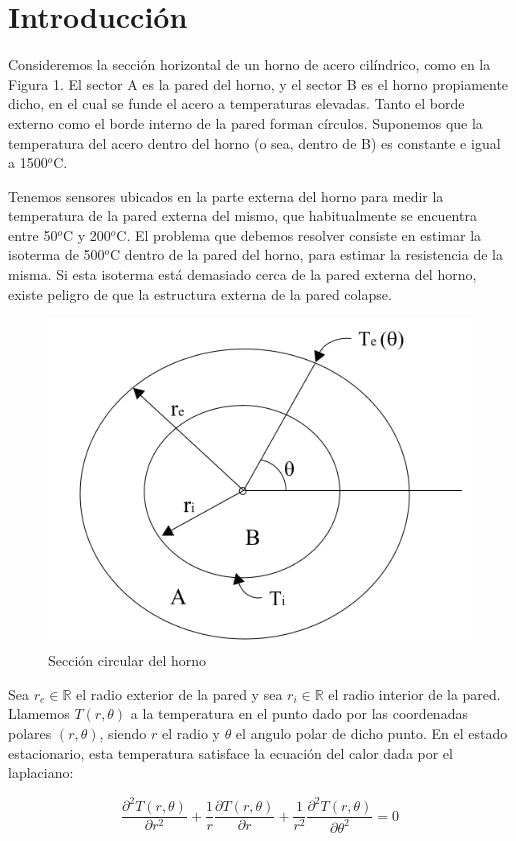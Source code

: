 \section{Introducción}

Consideremos la secci\'on horizontal de un horno de acero cil\'indrico, como en la Figura 1. El sector A es la pared del horno, y el sector B es el horno propiamente dicho, en el cual se funde el acero a temperaturas elevadas. Tanto el borde externo como el borde interno de la pared forman c\'irculos. Suponemos que la temperatura del acero dentro del horno (o sea, dentro de B) es constante e igual a 1500$^{o}$C.

\medskip

Tenemos sensores ubicados en la parte externa del horno para medir la temperatura de la pared externa del mismo, que habitualmente se encuentra entre 50$^{o}$C y 200$^{o}$C. El problema que debemos resolver consiste en estimar la isoterma de 500$^{o}$C dentro de la pared del horno, para estimar la resistencia de la misma. Si esta isoterma est\'a demasiado cerca de la pared externa del horno, existe peligro de que la estructura externa de la pared colapse.

\begin{figure}[ht]
\begin{center}
\includegraphics[width=0.4\columnwidth]{catedra/Horno.png}
\caption{Secci\'on circular del horno}
\end{center}
\end{figure}

Sea $r_e \in \mathbb{R}$ el radio exterior de la pared y sea $r_i \in \mathbb{R}$ el radio interior de la pared. Llamemos $T(r,\theta)$ a la temperatura en el punto dado por las coordenadas polares $(r,\theta)$, siendo $r$ el radio y $\theta$ el angulo polar de dicho punto. En el estado estacionario, esta temperatura satisface la ecuación del calor dada por el laplaciano:

\begin{equation}\label{calor}
\frac{\partial^2T(r,\theta)}{\partial r^2}+\frac{1}{r}\frac{\partial T(r,\theta)}{\partial r}+\frac{1}{r^2}\frac{\partial^2T(r,\theta)}{\partial \theta^2} = 0 
\end{equation}

